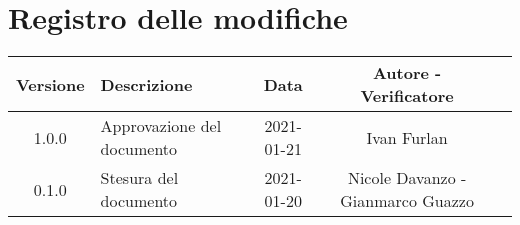 \section*{Registro delle modifiche}

\begin{center}
	\begin{longtable}{|c|p{5cm}|c|c|c|}
		\hline
		\rowcolor{lighter-grayer}
		\textbf{Versione} & \textbf{Descrizione} & \textbf{Data} & \textbf{Autore - Verificatore} \\
		\hline
		\endfirsthead


		\hline
		1.0.0 & Approvazione del documento & 2021-01-21 & Ivan Furlan\\
		0.1.0 & Stesura del documento & 2021-01-20 & Nicole Davanzo - Gianmarco Guazzo \\
		\hline
	\end{longtable}
\end{center}